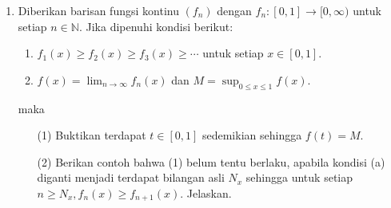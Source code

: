 \documentclass[12pt,twoside]{article}
\newenvironment{solution}
{
	\par\noindent\textbf{\underline{Solusi.}}\\
}
{
	\par
}
\begin{document}
\begin{enumerate}
\begin{solution}
\begin{enumerate}
            \item[(b)] Jawabannya adalah \textbf{Ya}, selalu berlaku $\text{Im}(S \circ T) = \text{Im}(S)$.
                  Secara matriks, kita ingin menunjukkan Ruang Kolom dari $A^T A$ sama dengan Ruang Kolom dari $A^T$.
                  Pertama, jelas bahwa $\text{Im}(S \circ T) \subseteq \text{Im}(S)$, karena untuk setiap $\mathbf{y} \in \text{Im}(S \circ T)$, $\mathbf{y} = (S \circ T)(\mathbf{x}) = S(T(\mathbf{x}))$, yang berarti $\mathbf{y}$ berada di Image dari $S$.
                  Kedua, kita gunakan Teorema Rank-Nullity (Dimensi). Untuk sebarang matriks $M$ berukuran $n \times n$:
                  \[ \dim(\ker(M)) + \dim(\text{Im}(M)) = n. \]
                  Terapkan pada $T$ dan $S \circ T$:
                  \[ \dim(\ker(T)) + \dim(\text{Im}(T)) = n \implies \text{rank}(A) = n - \dim(\ker(A)). \]
                  \[ \dim(\ker(S \circ T)) + \dim(\text{Im}(S \circ T)) = n \implies \text{rank}(A^T A) = n - \dim(\ker(A^T A)). \]
                  Dari bagian (a), kita tahu $\ker(S \circ T) = \ker(T)$, sehingga $\dim(\ker(S \circ T)) = \dim(\ker(T))$.
                  Akibatnya, $\dim(\text{Im}(S \circ T)) = \dim(\text{Im}(T))$.
                  Kita tahu bahwa $\text{rank}(A) = \text{rank}(A^T)$ alias $\dim(\text{Im}(T)) = \dim(\text{Im}(S))$.
                  Oleh karena itu, $\dim(\text{Im}(S \circ T)) = \dim(\text{Im}(S))$.
                  Karena $\text{Im}(S \circ T)$ adalah subruang dari $\text{Im}(S)$ dan memiliki dimensi yang sama (berhingga), maka kedua subruang tersebut haruslah sama.
                  Jadi, $\text{Im}(S \circ T) = \text{Im}(S)$.
          \end{enumerate}
        \end{solution}
  \item Diberikan barisan fungsi kontinu $(f_n)$ dengan $f_n:[0,1]\rightarrow[0,\infty)$ untuk setiap $n\in\mathbb{N}$. Jika dipenuhi kondisi berikut:
        \begin{enumerate}
          \item $f_1(x)\geq f_2(x)\geq f_3(x)\geq \cdots$ untuk setiap $x\in[0,1]$.
          \item $f(x)=\displaystyle\lim_{n\rightarrow\infty} f_n(x)$ dan $\displaystyle M=\sup_{0\leq x\leq 1} f(x)$.
        \end{enumerate}
        maka
        \begin{enumerate}
          \item[(1)] Buktikan terdapat $t\in[0,1]$ sedemikian sehingga $f(t)=M$.
          \item[(2)] Berikan contoh bahwa (1) belum tentu berlaku, apabila kondisi (a) diganti menjadi terdapat bilangan asli $N_x$  sehingga untuk setiap $n\geq N_x, f_n(x)\geq f_{n+1}(x)$. Jelaskan.
        \end{enumerate}


\end{enumerate}
\end{document}
